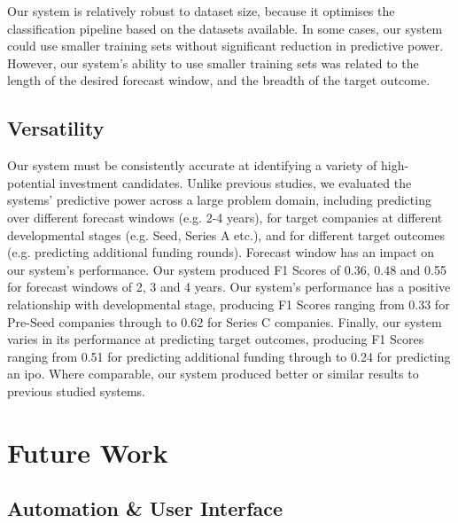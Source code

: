 \documentclass[../thesis/thesis.tex]{subfiles}
\begin{document}
Our system is relatively robust to dataset size, because it optimises the classification pipeline based on the datasets available. In some cases, our system could use smaller training sets without significant reduction in predictive power. However, our system's ability to use smaller training sets was related to the length of the desired forecast window, and the breadth of the target outcome.

\subsection{Versatility}

Our system must be consistently accurate at identifying a variety of high-potential investment candidates. Unlike previous studies, we evaluated the systems' predictive power across a large problem domain, including predicting over different forecast windows (e.g. 2-4 years), for target companies at different developmental stages (e.g. Seed, Series A etc.), and for different target outcomes (e.g. predicting additional funding rounds). Forecast window has an impact on our system's performance. Our system produced F1 Scores of 0.36, 0.48 and 0.55 for forecast windows of 2, 3 and 4 years. Our system's performance has a positive relationship with developmental stage, producing F1 Scores ranging from 0.33 for Pre-Seed companies through to 0.62 for Series C companies. Finally, our system varies in its performance at predicting target outcomes, producing F1 Scores ranging from 0.51 for predicting additional funding through to 0.24 for predicting an \gls{ipo}. Where comparable, our system produced better or similar results to previous studied systems.

\section{Future Work}

\subsection{Automation \& User Interface}
\end{document}
